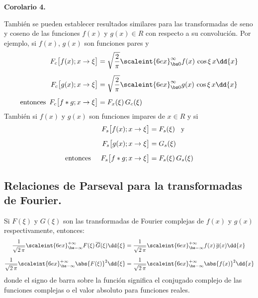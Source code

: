 \textbf{Corolario 4.}

También se pueden establecer resultados similares para las transformadas de seno y coseno de las funciones $f (x)$ y $g (x) \in R$ con respecto a su convolución. Por ejemplo, si $f (x)$, $g (x)$ son funciones pares y
\begin{align}
\begin{aligned}[b]
F_{c} \big[f (x); x \to \xi \big] &= \sqrt{\dfrac{2}{\pi}} \scaleint{6ex}_{\bs 0}^{\infty} f (x) \, \cos \xi \, x \dd{x} \\[0.5em]
F_{c} \big[g(x); x \to \xi \big] &= \sqrt{\dfrac{2}{\pi}} \scaleint{6ex}_{\bs 0}^{\infty} g(x) \, \cos \xi \, x \dd{x} \\[0.5em]
\mbox{entonces} \hspace{0.5em} F_{c} \big[f * g; x \to \xi \big] &= F_{x}(\xi) \, G_{c}(\xi)
\end{aligned}
\label{eq:ecuacion_01_28}
\end{align}
También si $f (x)$ y $g(x)$ son funciones impares de $x \in R$ y si
\begin{align}
\begin{aligned}[b]
F_{s} \big[f (x); x \to \xi \big] &= F_{s}(\xi) \hspace{0.3cm} \mbox{y} \\[0.5em]
F_{s} \big[g(x); x \to \xi \big] &= G_{s}(\xi) \\[0.5em]
\mbox{entonces} \hspace{0.5cm} F_{s} \big[f * g; x \to \xi \big] &= F_{s} (\xi) \, G_{s}(\xi) 
\end{aligned}
\label{eq:ecuacion_01_29}
\end{align}

\subsection{Relaciones de Parseval para la transformadas de Fourier.}

Si $F (\xi)$ y $G (\xi)$ son las transformadas de Fourier complejas de $f (x)$ y $g (x)$ respectivamente, entonces:
\begin{align}
\dfrac{1}{\sqrt{2 \, \pi}} \scaleint{6ex}_{\bs -\infty}^{+\infty} F (\xi) \, \overline{G}(\xi) \dd{\xi} &= \dfrac{1}{\sqrt{2 \, \pi}} \scaleint{6ex}_{\bs -\infty}^{+\infty} f (x) \, \overline{g}(x) \dd{x} \label{eq:ecuacion_01_30} \\[0.5em]
\dfrac{1}{\sqrt{2 \, \pi}} \scaleint{6ex}_{\bs -\infty}^{+\infty} \abs{F (\xi)}^{2} \dd{\xi} &= \dfrac{1}{\sqrt{2 \, \pi}} \scaleint{6ex}_{\bs -\infty}^{+\infty} \abs{f (x)}^{2} \dd{x} \label{eq:ecuacion_01_31}
\end{align}
donde el signo de barra sobre la función significa el conjugado complejo de las funciones complejas o el valor absoluto para funciones reales.

